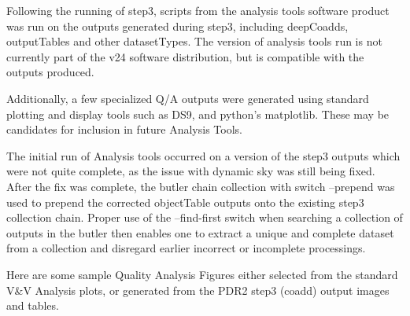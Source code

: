 Following the running of step3, scripts from the analysis tools software product
was run on the outputs generated during step3, including deepCoadds, outputTables and other
datasetTypes. The version of analysis tools run is not currently part of the v24 software distribution,
but is compatible with the outputs produced.

Additionally, a few specialized Q/A outputs were generated using standard plotting and display
tools such as DS9, and python's matplotlib.  These may be candidates for inclusion in future 
Analysis Tools.

The initial run of Analysis tools occurred on a version of the step3 outputs which were not
quite complete, as the issue with dynamic sky was still being fixed.  
After the fix was complete,  the butler chain collection with switch --prepend was used to
prepend the corrected objectTable outputs onto the existing step3 collection chain.
Proper use of the --find-first switch when searching a collection of outputs in the butler then
enables one to extract a unique and complete dataset from a collection and disregard earlier incorrect or 
incomplete processings.

Here are some sample Quality Analysis Figures either selected from the 
standard V\&V Analysis plots, or generated from the PDR2 step3 (coadd) 
output images and tables.

